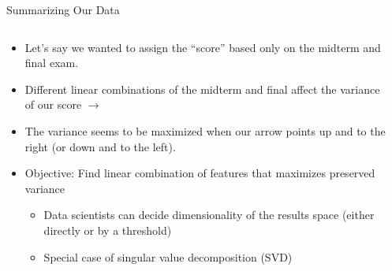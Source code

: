 \documentclass[aspectratio=169]{../latex_main/tntbeamer}  %
\begin{document}
	
	\begin{frame}{Summarizing Our Data}
	    \begin{columns}
	        \begin{column}{.5\textwidth}
	        
	       \vspace{-2em}
	        \begin{itemize}
	            \item Let’s say we wanted to assign the “score” based only on the midterm and final exam.
	            \item Different linear combinations of the midterm and final affect the variance of our score $\rightarrow$
	            \item The variance seems to be maximized when our arrow points up and to the right (or down and to the left).
                \item \alert{Objective:} Find linear combination of features that maximizes preserved variance	           
                \begin{itemize}
                    \item Data scientists can decide dimensionality of the results space (either directly or by a threshold)
                    \item Special case of singular value decomposition (SVD)
                \end{itemize}
	        \end{itemize}
	               
	        \end{column}
	        
	        \begin{column}{.5\textwidth}
	        

\end{column}
\end{columns}
\end{frame}
\end{document}

